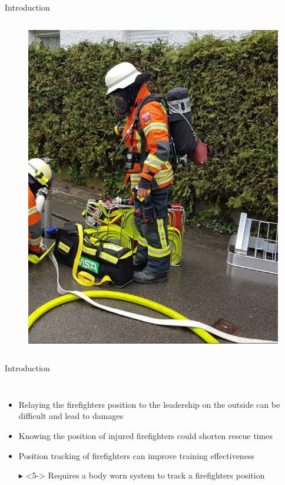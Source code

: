 \documentclass[aspectratio=169]{beamer}
\begin{document}
{\begin{frame}{Introduction}
\begin{columns}
			\begin{figure}
				\centering
				\includegraphics[height=0.7\textheight]{firefighter.png}
			\end{figure}
			
		\end{columns}
		
		
	\end{frame}
	
	\begin{frame}{Introduction}
			\begin{columns}
				\begin{itemize}
					\item<2-> Relaying the firefighters position to the leadership on the outside can be difficult and lead to damages
					\item<3-> Knowing the position of injured firefighters could shorten rescue times
					\item<4-> Position tracking of firefighters can improve training effectiveness
					\item[$\blacktriangleright$]<5-> Requires a body worn system to track a firefighters position
				\end{itemize}
		

\end{columns}
\end{frame}}
\end{document}
